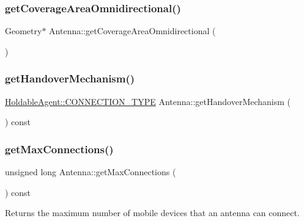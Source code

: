 \mbox{\label{class_antenna_adaca77948cf68db3348e2819264767f6}} 
\subsubsection{\texorpdfstring{getCoverageAreaOmnidirectional()}{getCoverageAreaOmnidirectional()}}
{\footnotesize\ttfamily Geometry$\ast$ Antenna\+::get\+Coverage\+Area\+Omnidirectional (\begin{DoxyParamCaption}{ }\end{DoxyParamCaption})\hspace{0.3cm}{\ttfamily [private]}}

\mbox{\label{class_antenna_a35001fa0ad0e015c275d08ac84d2982b}} 
\subsubsection{\texorpdfstring{getHandoverMechanism()}{getHandoverMechanism()}}
{\footnotesize\ttfamily \mbox{\hyperlink{class_holdable_agent_ae2c334b004d7b9c5a999cf2618e4e518}{Holdable\+Agent\+::\+C\+O\+N\+N\+E\+C\+T\+I\+O\+N\+\_\+\+T\+Y\+PE}} Antenna\+::get\+Handover\+Mechanism (\begin{DoxyParamCaption}{ }\end{DoxyParamCaption}) const}

\mbox{\label{class_antenna_ac7d42215283cd7d4dc16d449f61af91d}} 
\subsubsection{\texorpdfstring{getMaxConnections()}{getMaxConnections()}}
{\footnotesize\ttfamily unsigned long Antenna\+::get\+Max\+Connections (\begin{DoxyParamCaption}{ }\end{DoxyParamCaption}) const}

Returns the maximum number of mobile devices that an antenna can connect. \mbox{\label{class_antenna_a1c6126c232ee496b9b693fc20e4892f5}} 
